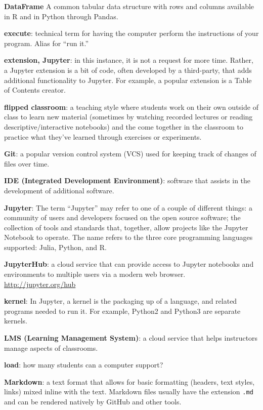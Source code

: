 \documentclass[]{book}
\begin{document}
\textbf{DataFrame} A common tabular data structure with rows and columns
available in R and in Python through Pandas.

\textbf{execute}: technical term for having the computer perform the
instructions of your program. Alias for ``run it.''

\textbf{extension, Jupyter}: in this instance, it is not a request for
more time. Rather, a Jupyter extension is a bit of code, often developed
by a third-party, that adds additional functionality to Jupyter. For
example, a popular extension is a Table of Contents creator.

\textbf{flipped classroom}: a teaching style where students work on
their own outside of class to learn new material (sometimes by watching
recorded lectures or reading descriptive/interactive notebooks) and the
come together in the classroom to practice what they've learned through
exercises or experiments.

\textbf{Git}: a popular version control system (VCS) used for keeping
track of changes of files over time.

\textbf{IDE (Integrated Development Environment)}: software that assists
in the development of additional software.

\textbf{Jupyter}: The term ``Jupyter'' may refer to one of a couple of
different things: a community of users and developers focused on the
open source software; the collection of tools and standards that,
together, allow projects like the Jupyter Notebook to operate. The name
refers to the three core programming languages supported: Julia, Python,
and R.

\textbf{JupyterHub}: a cloud service that can provide access to Jupyter
notebooks and environments to multiple users via a modern web browser.
\url{http://jupyter.org/hub}

\textbf{kernel}: In Jupyter, a kernel is the packaging up of a language,
and related programs needed to run it. For example, Python2 and Python3
are separate kernels.

\textbf{LMS (Learning Management System)}: a cloud service that helps
instructors manage aspects of classrooms.

\textbf{load}: how many students can a computer support?

\textbf{Markdown}: a text format that allows for basic formatting
(headers, text styles, links) mixed inline with the text. Markdown files
usually have the extension \texttt{.md} and can be rendered natively by
GitHub and other tools.
\end{document}
